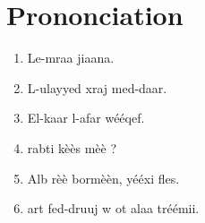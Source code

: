 \chapter{Prononciation}

\begin{enumerate}
    \item Le-mraa ji\ca aana.
    \item L-ulayyed xraj med-daar.
    \item El-kaar l-a\cs far wééqef.
    \item \VS rabt\vs i kèès mèè ?
    \item Alb\va{} \vs rèè bor\ct mèèn, yééxi fles.
    \item \CA\th art fed-druuj w \ct o\hb t \ca alaa tréémii.
\end{enumerate}